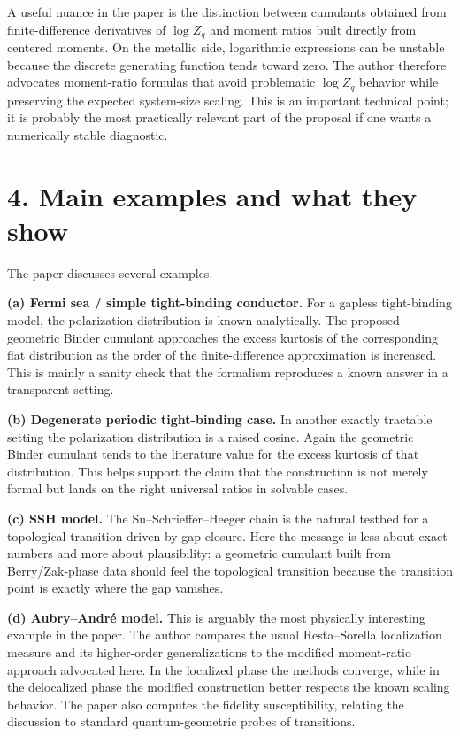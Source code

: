 \documentclass[11pt]{article}
\begin{document}
A useful nuance in the paper is the distinction between cumulants obtained from finite-difference derivatives of $\log Z_q$ and moment ratios built directly from centered moments. On the metallic side, logarithmic expressions can be unstable because the discrete generating function tends toward zero. The author therefore advocates moment-ratio formulas that avoid problematic $\log Z_q$ behavior while preserving the expected system-size scaling. This is an important technical point; it is probably the most practically relevant part of the proposal if one wants a numerically stable diagnostic.

\section*{4. Main examples and what they show}
The paper discusses several examples.

\textbf{(a) Fermi sea / simple tight-binding conductor.} For a gapless tight-binding model, the polarization distribution is known analytically. The proposed geometric Binder cumulant approaches the excess kurtosis of the corresponding flat distribution as the order of the finite-difference approximation is increased. This is mainly a sanity check that the formalism reproduces a known answer in a transparent setting.

\textbf{(b) Degenerate periodic tight-binding case.} In another exactly tractable setting the polarization distribution is a raised cosine. Again the geometric Binder cumulant tends to the literature value for the excess kurtosis of that distribution. This helps support the claim that the construction is not merely formal but lands on the right universal ratios in solvable cases.

\textbf{(c) SSH model.} The Su--Schrieffer--Heeger chain is the natural testbed for a topological transition driven by gap closure. Here the message is less about exact numbers and more about plausibility: a geometric cumulant built from Berry/Zak-phase data should feel the topological transition because the transition point is exactly where the gap vanishes.

\textbf{(d) Aubry--Andr\'e model.} This is arguably the most physically interesting example in the paper. The author compares the usual Resta--Sorella localization measure and its higher-order generalizations to the modified moment-ratio approach advocated here. In the localized phase the methods converge, while in the delocalized phase the modified construction better respects the known scaling behavior. The paper also computes the fidelity susceptibility, relating the discussion to standard quantum-geometric probes of transitions.
\end{document}
